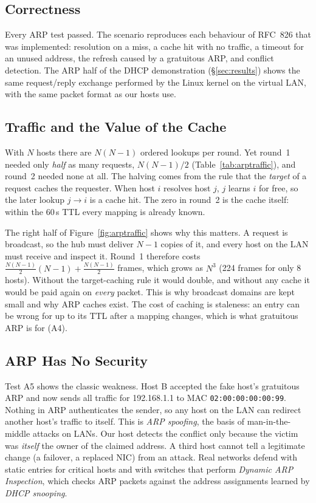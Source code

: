\documentclass[11pt]{article}
\begin{document}
\subsection{Correctness}
Every ARP test passed. The scenario reproduces each behaviour of RFC~826 that was
implemented: resolution on a miss, a cache hit with no traffic, a timeout for an unused
address, the refresh caused by a gratuitous ARP, and conflict detection. The ARP half
of the DHCP demonstration (\S\ref{sec:results}) shows the same request/reply exchange
performed by the Linux kernel on the virtual LAN, with the same packet format as our
hosts use.

\subsection{Traffic and the Value of the Cache}
\label{sec:arpanalysis}
With $N$ hosts there are $N(N-1)$ ordered lookups per round. Yet round~1 needed only
\emph{half} as many requests, $N(N-1)/2$ (Table~\ref{tab:arptraffic}), and round~2 needed
none at all. The halving comes from the rule that the \emph{target} of a request caches
the requester. When host $i$ resolves host $j$, $j$ learns $i$ for free, so the later
lookup $j\to i$ is a cache hit. The zero in round~2 is the cache itself: within the
60\,s TTL every mapping is already known.

The right half of Figure~\ref{fig:arptraffic} shows why this matters. A request is
broadcast, so the hub must deliver $N-1$ copies of it, and every host on the LAN must
receive and inspect it. Round~1 therefore costs $\frac{N(N-1)}{2}(N-1) + \frac{N(N-1)}{2}$
frames, which grows as $N^3$ (224 frames for only 8 hosts). Without the target-caching
rule it would double, and without any cache it would be paid again on \emph{every}
packet. This is why broadcast domains are kept small and why ARP caches exist. The cost
of caching is staleness: an entry can be wrong for up to its TTL after a mapping changes,
which is what gratuitous ARP is for (A4).

\subsection{ARP Has No Security}
Test A5 shows the classic weakness. Host B accepted the fake host's gratuitous ARP and
now sends all traffic for 192.168.1.1 to MAC \texttt{02:00:00:00:00:99}. Nothing in ARP
authenticates the sender, so any host on the LAN can redirect another host's traffic to
itself. This is \emph{ARP spoofing}, the basis of man-in-the-middle attacks on LANs. Our
host detects the conflict only because the victim was \emph{itself} the owner of the
claimed address. A third host cannot tell a legitimate change (a failover, a replaced
NIC) from an attack. Real networks defend with static entries for critical hosts and
with switches that perform \emph{Dynamic ARP Inspection}, which checks ARP packets
against the address assignments learned by \emph{DHCP snooping}.
\end{document}
